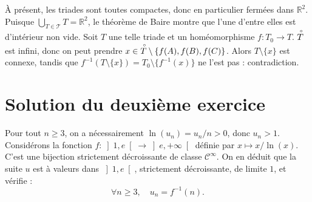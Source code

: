 À présent, les triades sont toutes compactes, donc en particulier fermées dans $\mathbb{R}^2 $. Puisque $\bigcup _{T\in \mathcal{T}} T = \mathbb{R}^2 $, le théorème de Baire montre que l'une d'entre elles est d'intérieur non vide. Soit $T$ une telle triade et un homéomorphisme $f:T_{0} \rightarrow T$. $\overset{\;\text{\tiny $\circ$}}{T}$ est infini, donc on peut prendre $x\in  \overset{\;\text{\tiny $\circ$}}{T} \setminus \{f(A),f(B),f(C)\}$. Alors $T \setminus \{x\}$ est connexe, tandis que $f^{-1} (T \setminus \{x\})=T_{0} \setminus \{f^{-1} (x)\}$ ne l'est pas : contradiction.

\section{Solution du deuxième exercice}

Pour tout $n \geqslant 3$, on a nécessairement $\ln(u_n) = u_n/n > 0$, donc $u_n > 1$.
Considérons la fonction $f : \left]1,e\right[ \to \left]e,+\infty\right[$ définie par $x \mapsto x/{\ln(x)}$.
C'est une bijection strictement décroissante de classe $\mathscr C^\infty$.
On en déduit que la suite $u$ est à valeurs dans $\left]1,e\right[$, strictement décroissante, de limite $1$, et vérifie :
\[
\forall n\geqslant 3,\quad u_n = f^{-1}(n).
\]

